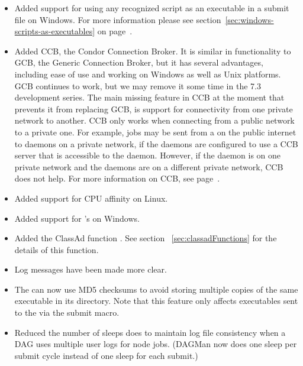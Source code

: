 \begin{itemize}

\item Added support for using any recognized script as an executable
in a submit file on Windows. For more information please see
section~\ref{sec:windows-scripts-as-executables} on
page~\pageref{sec:windows-scripts-as-executables}.

\item Added CCB, the Condor Connection Broker.  It is similar in
functionality to GCB, the Generic Connection Broker, but it has
several advantages, including ease of use and working on Windows as
well as Unix platforms.
GCB continues to work, but we may remove
it some time in the 7.3 development series.  The main missing feature
in CCB at the moment that prevents it from replacing GCB,
is support for connectivity from one private network to another.
CCB only works
when connecting from a public network to a private one.  For example,
jobs may be sent from a  on the public internet to 
 daemons on a
private network, if the  daemons are configured
to use a CCB server that is accessible to the  daemon.
However, if the  daemon is on one private
network and the  daemons are on a different private network,
CCB does not help.  For more information on CCB, see page~\pageref{sec:CCB}.

\item Added support for CPU affinity on Linux.

\item Added support for 's  on Windows.

\item Added the ClassAd function .
See section~ \ref{sec:classadFunctions} for the details of this function.

\item Log messages have been made more clear.

\item The  can now use MD5 checksums to avoid storing
multiple copies of the same executable in its  directory.
Note that this feature only affects executables sent to the
 via the  submit macro.

\item Reduced the number of sleeps  does to maintain log
file consistency when a DAG uses multiple user logs for node jobs.
(DAGMan now does one sleep per submit cycle instead of one sleep for
each submit.)

\end{itemize}

